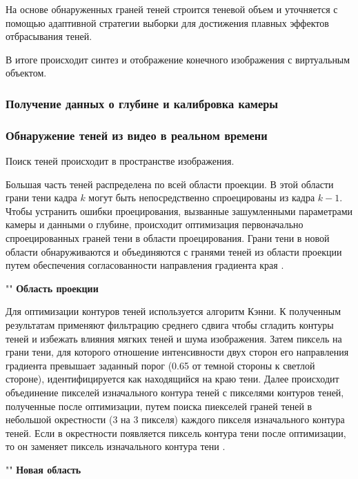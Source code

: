 На основе обнаруженных граней теней строится теневой объем и уточняется с помощью адаптивной стратегии выборки \cite{THOMASIAN2022385} для достижения плавных эффектов отбрасывания теней.

В итоге происходит синтез и отображение конечного изображения с виртуальным объектом.

\subsubsection*{Получение данных о глубине и калибровка камеры}



\subsubsection*{Обнаружение теней из видео в реальном времени}

Поиск теней происходит в пространстве изображения. 

Большая часть теней распределена по всей области проекции. В этой области грани тени кадра $k$ могут быть непосредственно спроецированы из кадра $k - 1$. Чтобы устранить ошибки проецирования, вызванные зашумленными параметрами камеры и данными о глубине, происходит оптимизация первоначально спроецированных граней тени в области проецирования. Грани тени в новой области обнаруживаются и объединяются с гранями теней из области проекции путем обеспечения согласованности направления градиента края \cite{wei2019simulating}.

""\newline
\indent\textbf{Область проекции}

Для оптимизации контуров теней используется алгоритм Кэнни. К полученным результатам применяют фильтрацию среднего сдвига чтобы сгладить контуры теней и избежать влияния мягких теней и шума изображения. Затем пиксель на грани тени, для которого отношение интенсивности двух сторон его направления градиента превышает заданный порог (0.65 от темной стороны к светлой стороне), идентифицируется как находящийся на краю тени. Далее происходит объединение пикселей изначального контура теней с пикселями контуров теней, полученные после оптимизации, путем поиска пиекселей граней теней в небольшой окрестности (3 на 3 пикселя) каждого пикселя изначального контура теней. Если в окрестности появляется пиксель контура тени после оптимизации, то он заменяет пиксель изначального контура тени \cite{wei2019simulating}.

""\newline
\indent\textbf{Новая область}


